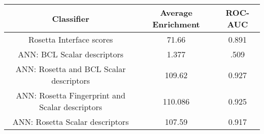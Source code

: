 \begin{tabular}{|c|c|c|}
\hline
Classifier &  Average Enrichment & ROC-AUC \\
\hline
Rosetta Interface scores & 71.66 & 0.891 \\
\hline
ANN: BCL Scalar descriptors & 1.377 & .509 \\
\hline
ANN: Rosetta and BCL Scalar descriptors & 109.62  & 0.927 \\
\hline
ANN: Rosetta Fingerprint and Scalar descriptors & 110.086 & 0.925 \\
\hline
ANN: Rosetta Scalar descriptors & 107.59 & 0.917 \\
\hline
\end{tabular}